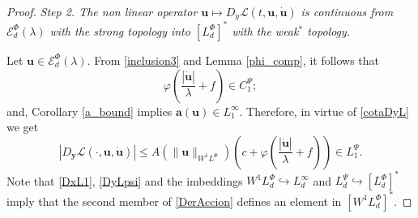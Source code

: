 \documentclass[twoside]{elsarticle}
\theoremstyle{remark}
\newcommand{\lphi}{L^{\Phi}}
\newcommand{\lpsi}{L^{\Psi}}
\newcommand{\wphi}{W^{1}\lphi}
\newcommand{\domi}{\mathcal{E}^{\Phi}_d(\lambda)}
\renewcommand{\b}[1]{\boldsymbol{#1}}
\renewcommand{\leq}{\leqslant}
\begin{document}
\begin{proof}
\noindent\emph{Step 2. The non linear operator   $\b{u}
 \mapsto  D_{y}\mathcal{L}(t,\b{u},\b{\dot{u}})$ is continuous from $\domi$ with the strong topology  into $\left[\lphi_d\right]^*$  with the weak$^*$ topology.}

 Let $\b{u}\in \domi$.  From  \eqref{inclusion3} and Lemma \ref{phi_comp},  it follows that 
\begin{equation}\label{AcotOperphi}
\varphi\left(\frac{|\b{\dot{u}}|}{\lambda}+f\right)\in C^{\Psi}_1;
\end{equation}
and, Corollary \ref{a_bound} implies $\b{a}(\b{u})\in L^{\infty}_1$. 
Therefore, in virtue of  \eqref{cotaDyL} we get
\begin{equation}\label{DyLpsi}
   \left|D_{\b{y}}\mathcal{L}(\cdot,\b{u},\b{\dot{u}})\right|\leq  A(\|\b{u}\|_{\wphi} )  \left(c+\varphi\left( \frac{|\b{\dot{u}}|}{\lambda}+f\right  ) \right)\in\lpsi_1.
\end{equation}
 Note that \eqref{DxL1},  \eqref{DyLpsi} and the imbeddings $\wphi_d \hookrightarrow L_d^{\infty}$ and  $\lpsi_d\hookrightarrow  \left[\lphi_d\right]^*$ imply that the second member of
\eqref{DerAccion} defines an element in $\left[\wphi_d\right]^*$.


\end{proof}
\end{document}

